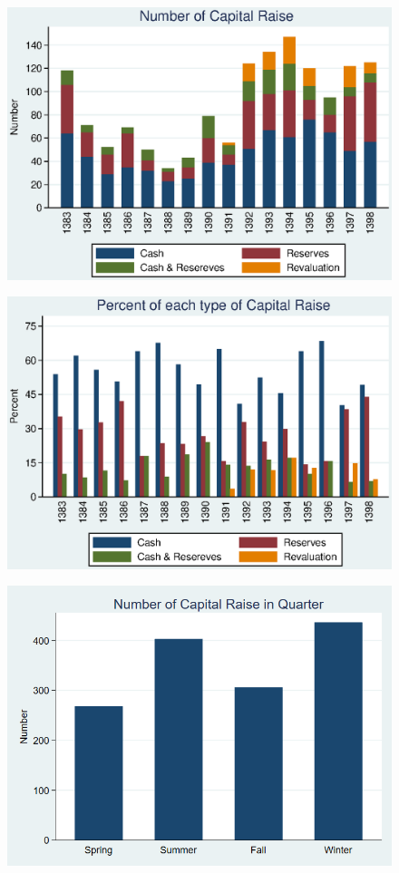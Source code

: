 \documentclass[12pt]{article}
\begin{document}
\begin{figure}
\centering
\includegraphics[width=0.7\linewidth]{Number2.eps}
\caption{}
\label{fig:number2}
\end{figure}

\begin{figure}
\centering
\includegraphics[width=0.7\linewidth]{Number3.eps}
\caption{}
\label{fig:number3}
\end{figure}

\begin{figure}
\centering
\includegraphics[width=0.7\linewidth]{QNumber}
\caption{}
\label{fig:qnumber}
\end{figure}
\end{document}
